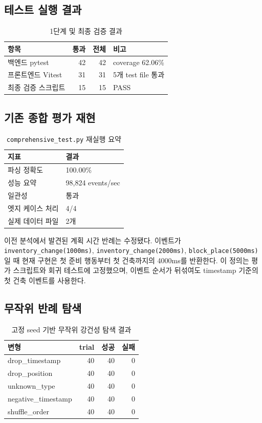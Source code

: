 \documentclass[11pt,a4paper]{article}
\begin{document}
\subsection{테스트 실행 결과}
\begin{table}[h]
\centering
\begin{tabular}{lrrl}
\toprule
항목 & 통과 & 전체 & 비고 \\
\midrule
백엔드 pytest & 42 & 42 & coverage 62.06\% \\
프론트엔드 Vitest & 31 & 31 & 5개 test file 통과 \\
최종 검증 스크립트 & 15 & 15 & PASS \\
\bottomrule
\end{tabular}
\caption{1단계 및 최종 검증 결과}
\end{table}

\subsection{기존 종합 평가 재현}
\begin{table}[h]
\centering
\begin{tabular}{ll}
\toprule
지표 & 결과 \\
\midrule
파싱 정확도 & 100.00\% \\
성능 요약 & 98,824 events/sec \\
일관성 & 통과 \\
엣지 케이스 처리 & 4/4 \\
실제 데이터 파일 & 2개 \\
\bottomrule
\end{tabular}
\caption{\texttt{comprehensive\_test.py} 재실행 요약}
\end{table}

이전 분석에서 발견된 계획 시간 반례는 수정됐다. 이벤트가
\texttt{inventory\_change(1000ms)}, \texttt{inventory\_change(2000ms)},
\texttt{block\_place(5000ms)}일 때 현재 구현은 첫 준비 행동부터 첫 건축까지의 4000ms를
반환한다. 이 정의는 평가 스크립트와 회귀 테스트에 고정했으며, 이벤트 순서가 뒤섞여도 timestamp
기준의 첫 건축 이벤트를 사용한다.

\subsection{무작위 반례 탐색}
\begin{table}[h]
\centering
\begin{tabular}{lrrr}
\toprule
변형 & trial & 성공 & 실패 \\
\midrule
drop\_timestamp & 40 & 40 & 0 \\
drop\_position & 40 & 40 & 0 \\
unknown\_type & 40 & 40 & 0 \\
negative\_timestamp & 40 & 40 & 0 \\
shuffle\_order & 40 & 40 & 0 \\
\bottomrule
\end{tabular}
\caption{고정 seed 기반 무작위 강건성 탐색 결과}
\end{table}
\end{document}
